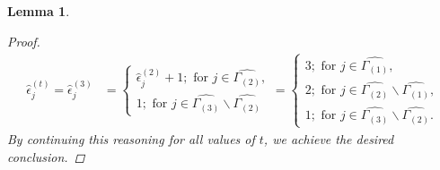 \documentclass[pdflatex,sn-mathphys-num]{sn-jnl}%
\newtheorem{lemma}{Lemma}
\theoremstyle{thmstyleone}%
\theoremstyle{thmstyletwo}%
\theoremstyle{thmstylethree}%
\begin{document}
\begin{lemma}
\begin{proof}
\begin{align*}
              \hat{\epsilon}_{j}^{(t)}=\hat{\epsilon}_{j}^{(3)} &=\begin{cases}
              \hat{\epsilon}_{j}^{(2)}+1;\text{ for }j\in\widehat{\Gamma_{(2)}}, \\
              1;\text{ for }j\in\widehat{\Gamma_{(3)}}\backslash\widehat{\Gamma_{(2)}}
          \end{cases}
           =\begin{cases}
              3;\text{ for }j\in\widehat{\Gamma_{(1)}}, \\
              2;\text{ for }j\in\widehat{\Gamma_{(2)}}\backslash\widehat{\Gamma_{(1)}}, \\
              1;\text{ for }j\in\widehat{\Gamma_{(3)}}\backslash\widehat{\Gamma_{(2)}}.
          \end{cases}
          \end{align*}
          By continuing this reasoning for all values of $t$, we achieve the desired conclusion.
     \end{proof}
 \end{lemma}    
\end{document}
